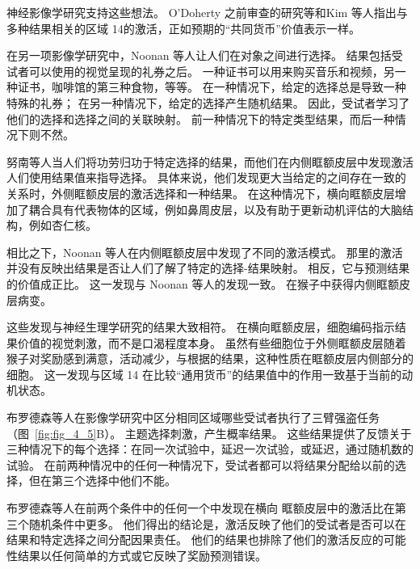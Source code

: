 神经影像学研究支持这些想法。
O'Doherty\cite{o2001abstract} 之前审查的研究等和Kim 等人\cite{kim2011overlapping}指出与多种结果相关的区域 14的激活，正如预期的“共同货币”价值表示一样。\par


在另一项影像学研究中，Noonan 等人\cite{noonan2011distinct}让人们在对象之间进行选择。
结果包括受试者可以使用的视觉呈现的礼券之后。
一种证书可以用来购买音乐和视频，另一种证书，咖啡馆的第三种食物，等等。
在一种情况下，给定的选择总是导致一种特殊的礼券； 在另一种情况下，给定的选择产生随机结果。
因此，受试者学习了他们的选择和选择之间的关联映射。
前一种情况下的特定类型结果，而后一种情况下则不然。\par


努南等人当人们将功劳归功于特定选择的结果，而他们在内侧眶额皮层中发现激活人们使用结果值来指导选择。
具体来说，他们发现更大当给定的之间存在一致的关系时，外侧眶额皮层的激活选择和一种结果。
在这种情况下，横向眶额皮层增加了耦合具有代表物体的区域，例如鼻周皮层，以及有助于更新动机评估的大脑结构，例如杏仁核。\par


相比之下，Noonan 等人在内侧眶额皮层中发现了不同的激活模式。
那里的激活并没有反映出结果是否让人们了解了特定的选择-结果映射。
相反，它与预测结果的价值成正比。
这一发现与 Noonan 等人的发现一致\cite{noonan2010separate}。
在猴子中获得内侧眶额皮层病变。\par


这些发现与神经生理学研究的结果大致相符。
在横向眶额皮层，细胞编码指示结果价值的视觉刺激，而不是口渴程度本身\cite{bouret2010ventromedial}。
虽然有些细胞位于外侧眶额皮层随着猴子对奖励感到满意，活动减少，与根据\cite{critchley1996hunger}的结果，这种性质在眶额皮层内侧部分的细胞\cite{bouret2010ventromedial}。
这一发现与区域 14 在比较“通用货币”的结果值中的作用一致基于当前的动机状态。\par


布罗德森等人\cite{brodersenorbitofrontal}在影像学研究中区分相同区域哪些受试者执行了三臂强盗任务（图~\ref{fig:fig_4_5}B）。
主题选择刺激，产生概率结果。
这些结果提供了反馈关于三种情况下的每个选择：在同一次试验中，延迟一次试验，或延迟，通过随机数的试验。
在前两种情况中的任何一种情况下，受试者都可以将结果分配给以前的选择，但在第三个选择中他们不能。\par


布罗德森等人在前两个条件中的任何一个中发现在横向 眶额皮层中的激活比在第三个随机条件中更多。
他们得出的结论是，激活反映了他们的受试者是否可以在结果和特定选择之间分配因果责任。
他们的结果也排除了他们的激活反应的可能性结果以任何简单的方式或它反映了奖励预测错误。\par


